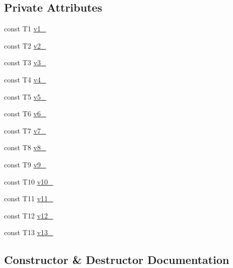 \subsection*{Private Attributes}
\begin{DoxyCompactItemize}
\item 
const T1 \mbox{\hyperlink{classtesting_1_1internal_1_1_value_array13_a0dcc242e11bbb1de331f70f6e0bca1bf}{v1\+\_\+}}
\item 
const T2 \mbox{\hyperlink{classtesting_1_1internal_1_1_value_array13_a6ca4e394407007705e8f0867ee37ae98}{v2\+\_\+}}
\item 
const T3 \mbox{\hyperlink{classtesting_1_1internal_1_1_value_array13_ae451fb594af6c93585bca00cde71cd9e}{v3\+\_\+}}
\item 
const T4 \mbox{\hyperlink{classtesting_1_1internal_1_1_value_array13_a2723b475b68242f3316a82f13e85fefd}{v4\+\_\+}}
\item 
const T5 \mbox{\hyperlink{classtesting_1_1internal_1_1_value_array13_a60e8496cacc1cb6b9924cebecdccc145}{v5\+\_\+}}
\item 
const T6 \mbox{\hyperlink{classtesting_1_1internal_1_1_value_array13_a93c197971cb5d56c8cb16326882a4e40}{v6\+\_\+}}
\item 
const T7 \mbox{\hyperlink{classtesting_1_1internal_1_1_value_array13_ad79bbe4535641485467f3a71cc91e900}{v7\+\_\+}}
\item 
const T8 \mbox{\hyperlink{classtesting_1_1internal_1_1_value_array13_a9d20e7e2e3010fa05f01d5f8f6367b87}{v8\+\_\+}}
\item 
const T9 \mbox{\hyperlink{classtesting_1_1internal_1_1_value_array13_a38cf3ad4d73e7a5ea38618943df0c4fb}{v9\+\_\+}}
\item 
const T10 \mbox{\hyperlink{classtesting_1_1internal_1_1_value_array13_a334b48add5a85775b58e9d4cb02ff649}{v10\+\_\+}}
\item 
const T11 \mbox{\hyperlink{classtesting_1_1internal_1_1_value_array13_a3eed0bd6caed53c84de05959ac504abc}{v11\+\_\+}}
\item 
const T12 \mbox{\hyperlink{classtesting_1_1internal_1_1_value_array13_a7e8555b4c6b73eb5af5b68946e75f32f}{v12\+\_\+}}
\item 
const T13 \mbox{\hyperlink{classtesting_1_1internal_1_1_value_array13_a09e991b6c1e2bf7e9d7d969f07bf8215}{v13\+\_\+}}
\end{DoxyCompactItemize}


\subsection{Constructor \& Destructor Documentation}
\mbox{\label{classtesting_1_1internal_1_1_value_array13_a57505ac7a4fbb86f4121bf1d41b0352d}} 

